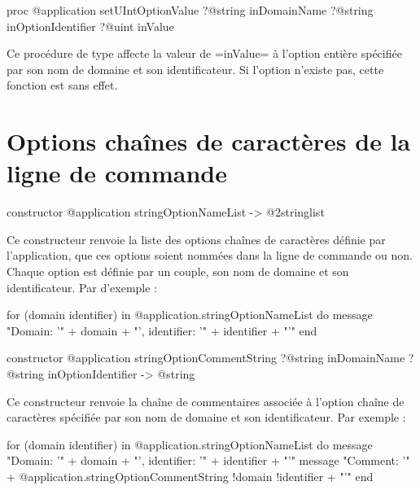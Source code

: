 \begin{galgasbox}
proc @application setUIntOptionValue
    ?@string inDomainName
    ?@string inOptionIdentifier
    ?@uint inValue
\end{galgasbox}

Ce procédure de type affecte la valeur de \ggs=inValue= à l'option entière spécifiée par son nom de domaine et son identificateur. Si l'option n'existe pas, cette fonction est sans effet.

















\section{Options chaînes de caractères de la ligne de commande}


\begin{galgasbox}
constructor @application stringOptionNameList -> @2stringlist
\end{galgasbox}

Ce constructeur renvoie la liste des options chaînes de caractères définie par l'application, que ces options soient nommées dans la ligne de commande ou non. Chaque option est définie par un couple, son nom de domaine et son identificateur. Par d'exemple :
\begin{galgas}
for (domain identifier) in @application.stringOptionNameList do
  message "Domain: '" + domain + "', identifier: '" + identifier + "'\n"
end
\end{galgas}



\begin{galgasbox}
constructor @application stringOptionCommentString
    ?@string inDomainName
    ?@string inOptionIdentifier -> @string
\end{galgasbox}

Ce constructeur renvoie la chaîne de commentaires associée à l'option chaîne de caractères spécifiée par son nom de domaine et son identificateur. Par exemple :
\begin{galgas}
for (domain identifier) in @application.stringOptionNameList do
  message "Domain: '" + domain + "', identifier: '" + identifier + "'\n"
  message "Comment: '"
    + @application.stringOptionCommentString {!domain !identifier} + "'\n"
end
\end{galgas}

